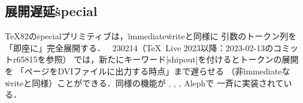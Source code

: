 \documentclass[a4paper,11pt,nomag,dvipdfmx]{jsarticle}
\begin{document}
\subsection{展開遅延\.{special}}
\begin{cslist}
  \TeX82の\.{special}プリミティブは，\.{immediate}\.{write}と同様に
  引数のトークン列を「即座に」完全展開する．
  \epTeX~230214（\TeX~Live 2023以降：2023-02-13のコミットr65815を参照）
  では，新たにキーワード|shipout|を付けるとトークンの展開を
  「ページをDVIファイルに出力する時点」まで遅らせる
  （非\.{immediate}な\.{write}と同様）ことができる．同様の機能が
  , , , Alephで
  一斉に実装されている．
\end{cslist}


\begin{comment}
\section{互換性}
\eTeX, \pTeX との互換性をはかるのに有効な手段としては，まず\texttt{TRIP}
testがある．\cite{h7k}にも書いたが，これは\TeX のソースの全行を実行する
ようなテストソースであり，\texttt{TRIP} testの実行結果が違えば，どこかの
動作が違っていることが分かるという仕掛けである．

幸いにも，\epTeX の（compatibility modeにおける）\texttt{TRIP} testの実行結果は，\pTeX のそれとほとん
ど同じであり，違う点は以下のみであった：
\begin{itemize}
\item \texttt{Memory usage}の違い：
\begin{alltt}
  Memory usage before: \(x\,\)&\(\,y\); after: \(z\,\)\&\(\,w\); still untouched: \(u\)
\end{alltt}
のところで，$x$, $z$が4多く，$u$が4少ない．
\item （\texttt{FAM256}パッチのおかげで）数式フォントが256個同時に
扱えるようになったことによる，エラーの未発生やエラーメッセージの違い．
\item ログの最後に出てくる，メモリ総使用量．
\end{itemize}
また，extended modeと
compatibility modeによる出力の違いを検証すると，Memory usageの違いやメモリ総使用量の他に
は，\texttt{e-TRIP}の説明書p.\ 4の項目4.にある違いしか見受けられなかった，

\par\vskip0.5\baselineskip\par


\end{comment}
\end{document}
